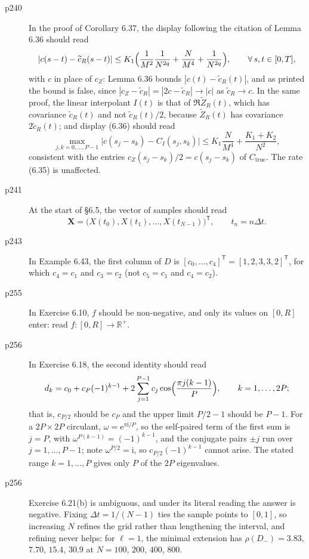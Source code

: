 \documentclass[final]{article}
\theoremstyle{definition}
\newcommand{\vecbs}[1]{\boldsymbol{#1}}
\renewcommand{\vec}[1]{{\vecbs{#1}}}
\begin{document}
\begin{enumerate}
\begin{description}
   \item[p240] In the proof of Corollary 6.37, the display following the
citation of Lemma 6.36 should read
\[
|c(s-t)-\widetilde{c}_R(s-t)|
\le K_1\Bigl(\frac{1}{M^2}\frac{1}{N^{2q}}+\frac{N}{M^4}
+\frac{1}{N^{2q}}\Bigr),
\qquad\forall\,s,t\in[0,T],
\]
with $c$ in place of $c_Z$: Lemma 6.36 bounds $|c(t)-\widetilde{c}_R(t)|$, and
as printed the bound is false, since
$|c_Z-\widetilde{c}_R|=|2c-\widetilde{c}_R|\to|c|$ as
$\widetilde{c}_R\to c$. In the same proof, the linear interpolant $I(t)$ is
that of $\Re\widetilde{Z}_R(t)$, which has covariance $\widetilde{c}_R(t)$ and
not $\widetilde{c}_R(t)/2$, because $\widetilde{Z}_R(t)$ has covariance
$2\widetilde{c}_R(t)$; and display (6.36) should read
\[
\max_{j,k=0,\dots,P-1}\bigl|c(s_j-s_k)-C_I(s_j,s_k)\bigr|
\le K_1\frac{N}{M^4}+\frac{K_1+K_2}{N^2},
\]
consistent with the entries $c_Z(s_j-s_k)/2=c(s_j-s_k)$ of
$C_{\mathrm{true}}$. The rate (6.35) is unaffected.
   \item[p241] At the start of \S6.5, the vector of samples should
read
\[
\vec X=\bigl(X(t_0),X(t_1),\dots,X(t_{N-1})\bigr)^{\mathsf{T}},
\qquad t_n=n\Delta t.
\]
   \item[p243] In Example 6.43, the first column of $D$ is
$[c_0,\dots,c_4]^{\mathsf T}=[1,2,3,3,2]^{\mathsf T}$, for which $c_4=c_1$ and
$c_3=c_2$ (not $c_5=c_1$ and $c_4=c_2$).
   \item[p255] In Exercise 6.10, $f$ should be non-negative, and only its
values on $[0,R]$ enter: read $f\colon[0,R]\to\mathbb{R}^+$.
   \item[p256] In Exercise 6.18, the second identity should read
\[
d_k=c_0+c_P(-1)^{k-1}
+2\sum_{j=1}^{P-1}c_j\cos\Bigl(\frac{\pi j(k-1)}{P}\Bigr),
\qquad k=1,\dots,2P;
\]
that is, $c_{P/2}$ should be $c_P$ and the upper limit $P/2-1$ should be $P-1$.
For a $2P\times2P$ circulant, $\omega=\mathrm{e}^{\pi\mathrm{i}/P}$, so the
self-paired term of the first sum is $j=P$, with $\omega^{P(k-1)}=(-1)^{k-1}$,
and the conjugate pairs $\pm j$ run over $j=1,\dots,P-1$; note
$\omega^{P/2}=\mathrm{i}$, so $c_{P/2}(-1)^{k-1}$ cannot arise. The stated
range $k=1,\dots,P$ gives only $P$ of the $2P$ eigenvalues.
   \item[p256] Exercise 6.21(b) is ambiguous, and under its literal reading the
answer is negative. Fixing $\Delta t=1/(N-1)$ ties the sample points to $[0,1]$,
so increasing $N$ refines the grid rather than lengthening the interval, and
refining never helps: for $\ell=1$, the minimal extension has
$\rho(D_-)=3.83$, $7.70$, $15.4$, $30.9$ at $N=100$, $200$, $400$, $800$.

\end{description}
\end{enumerate}
\end{document}

